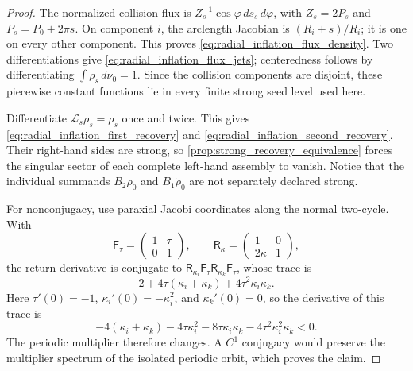 \documentclass[11pt]{amsart}
\theoremstyle{compactplain}
\theoremstyle{compactdefinition}
\theoremstyle{compactremark}
\newcommand{\Ltransfer}{\mathscr L}
\begin{document}
\begin{proof}
The normalized collision flux is
\(Z_s^{-1}\cos\varphi\,ds_s\,d\varphi\), with
\(Z_s=2P_s\) and \(P_s=P_0+2\pi s\).  On component \(i\), the arclength
Jacobian is \((R_i+s)/R_i\); it is one on every other component.  This proves
\eqref{eq:radial_inflation_flux_density}.  Two differentiations give
\eqref{eq:radial_inflation_flux_jets}; centeredness follows by differentiating
\(\int\rho_s\,d\nu_0=1\).  Since the collision components are disjoint, these
piecewise constant functions lie in every finite strong seed level used here.

Differentiate \(\Ltransfer_s\rho_s=\rho_s\) once and twice.  This gives
\eqref{eq:radial_inflation_first_recovery} and
\eqref{eq:radial_inflation_second_recovery}.  Their right-hand sides are
strong, so \cref{prop:strong_recovery_equivalence} forces the singular sector
of each complete left-hand assembly to vanish.  Notice that the individual
summands \(B_2\rho_0\) and \(B_1\dot\rho_0\) are not separately declared
strong.

For nonconjugacy, use paraxial Jacobi coordinates along the normal two-cycle.
With
\[
 \mathsf F_\tau=\begin{pmatrix}1&\tau\\0&1\end{pmatrix},\qquad
 \mathsf R_\kappa=\begin{pmatrix}1&0\\2\kappa&1\end{pmatrix},
\]
the return derivative is conjugate to
\(\mathsf R_{\kappa_i}\mathsf F_\tau
  \mathsf R_{\kappa_k}\mathsf F_\tau\), whose trace is
\[
 2+4\tau(\kappa_i+\kappa_k)+4\tau^2\kappa_i\kappa_k.
\]
Here \(\tau'(0)=-1\), \(\kappa_i'(0)=-\kappa_i^2\), and
\(\kappa_k'(0)=0\), so the derivative of this trace is
\[
 -4(\kappa_i+\kappa_k)-4\tau\kappa_i^2
 -8\tau\kappa_i\kappa_k-4\tau^2\kappa_i^2\kappa_k<0.
\]
The periodic multiplier therefore changes.  A \(C^1\) conjugacy would preserve
the multiplier spectrum of the isolated periodic orbit, which proves the
claim.
\end{proof}
\end{document}
